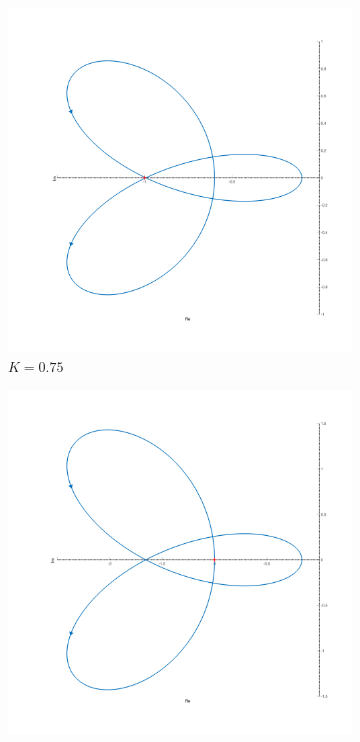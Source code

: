\begin{figure}[ht!]
    \centering
    \begin{subfigure}{0.5\textwidth}
        \centering
        \includegraphics[width=\textwidth]{media/plots/task5_nyquist_5.png}
        \caption{$K = 0.75$}
    \end{subfigure}%
    \begin{subfigure}{0.5\textwidth}
        \centering
        \includegraphics[width=\textwidth]{media/plots/task5_nyquist_6.png}

\end{subfigure}
\end{figure}
